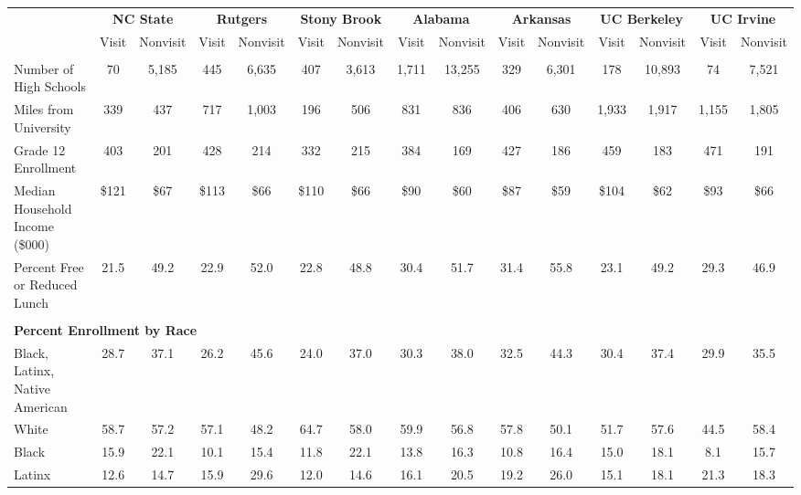 \begin{tabular*}{\linewidth}{@{\extracolsep{\fill} } lcccccccccccccc}%
&\multicolumn{2}{c}{\bfseries NC State}&\multicolumn{2}{c}{\bfseries Rutgers}&\multicolumn{2}{c}{\bfseries Stony Brook}&\multicolumn{2}{c}{\bfseries Alabama}&\multicolumn{2}{c}{\bfseries Arkansas}&\multicolumn{2}{c}{\bfseries UC Berkeley}&\multicolumn{2}{c}{\bfseries UC Irvine}\\%
&Visit&\multicolumn{1}{l}{Nonvisit}&Visit&\multicolumn{1}{l}{Nonvisit}&Visit&\multicolumn{1}{l}{Nonvisit}&Visit&\multicolumn{1}{l}{Nonvisit}&Visit&\multicolumn{1}{l}{Nonvisit}&Visit&\multicolumn{1}{l}{Nonvisit}&Visit&\multicolumn{1}{l}{Nonvisit}\\%
\hline%
&&&&&&&&&&&&&&\\%
\hspace{0cm}Number of High Schools&70&5,185&445&6,635&407&3,613&1,711&13,255&329&6,301&178&10,893&74&7,521\\%
\hspace{0cm}Miles from University&339&437&717&1,003&196&506&831&836&406&630&1,933&1,917&1,155&1,805\\%
\hspace{0cm}Grade 12 Enrollment&403&201&428&214&332&215&384&169&427&186&459&183&471&191\\%
\hspace{0cm}Median Household Income (\$000)&\$121&\$67&\$113&\$66&\$110&\$66&\$90&\$60&\$87&\$59&\$104&\$62&\$93&\$66\\%
\hspace{0cm}Percent Free or Reduced Lunch&21.5&49.2&22.9&52.0&22.8&48.8&30.4&51.7&31.4&55.8&23.1&49.2&29.3&46.9\\%
&&&&&&&&&&&&&&\\%
\multicolumn{15}{l}{\bfseries Percent Enrollment by Race}\\%
\hspace{0.2cm}Black, Latinx, Native American&28.7&37.1&26.2&45.6&24.0&37.0&30.3&38.0&32.5&44.3&30.4&37.4&29.9&35.5\\%
\hspace{0.2cm}White&58.7&57.2&57.1&48.2&64.7&58.0&59.9&56.8&57.8&50.1&51.7&57.6&44.5&58.4\\%
\hspace{0.2cm}Black&15.9&22.1&10.1&15.4&11.8&22.1&13.8&16.3&10.8&16.4&15.0&18.1&8.1&15.7\\%
\hspace{0.2cm}Latinx&12.6&14.7&15.9&29.6&12.0&14.6&16.1&20.5&19.2&26.0&15.1&18.1&21.3&18.3\\%

\end{tabular*}
